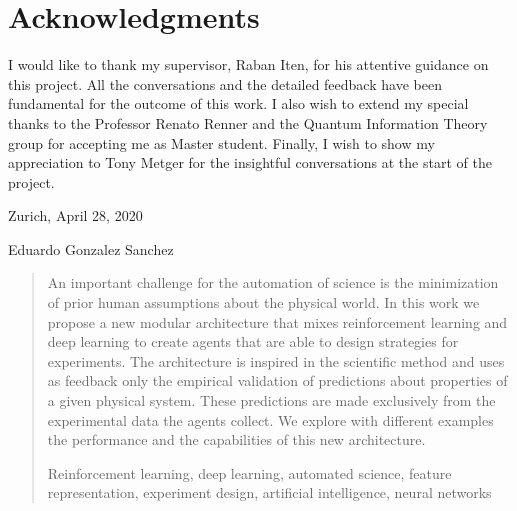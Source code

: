 \documentclass[11pt,a4paper,twoside]{report}
\newcommand{\+}{\textnormal{+} }
\theoremstyle{definition}
\numberwithin{equation}{chapter}
\begin{document}
%
%
%
\chapter*{Acknowledgments}
I would like to thank my supervisor, Raban Iten, for his attentive guidance on
this project. All the conversations and the detailed feedback have 
been fundamental for the outcome of this work. I also wish to extend my special
thanks to the Professor Renato Renner and the Quantum Information Theory group
for accepting me as Master student. Finally, I wish to show my appreciation to
Tony Metger for the insightful conversations at the start of the project.

\vspace{1.1cm}
\noindent
Zurich,  April 28, 2020

\vspace{2.4cm}
\noindent
Eduardo Gonzalez Sanchez
\thispagestyle{plain}
\clearpage

\thispagestyle{plain}
\cleardoublepage
%
%
%
\huge
\begin{abstract}
  \setcounter{page}{5}
\thispagestyle{plain}
  \normalsize
  \vspace{0.5cm}


\noindent An important challenge for the automation of science is the
minimization of prior human assumptions about the physical world.
In this work we propose a new modular architecture that mixes reinforcement
learning and deep learning to create agents that are able to design strategies
for experiments. The architecture is inspired in the scientific method and uses
as feedback only the empirical validation of predictions about properties of a
given physical system. These predictions are made exclusively from the
experimental data the agents collect. We explore with different examples the
performance and the capabilities of this new architecture.

\vspace{3mm}

\noindent 

\vspace{10mm}
Reinforcement learning, deep learning, automated science, feature representation, 
experiment design, artificial intelligence, neural networks
\end{abstract}
\end{document}
